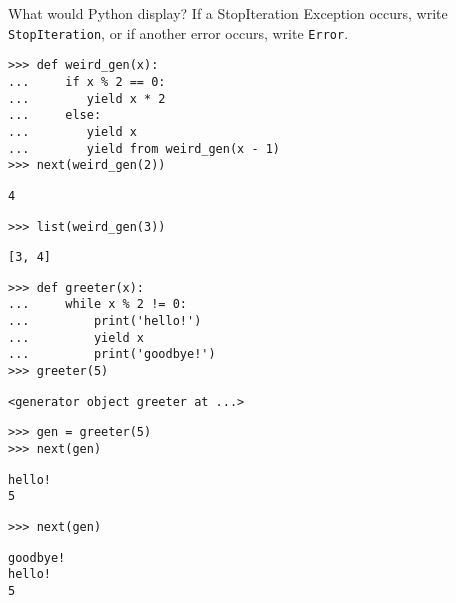 \question What would Python display? If a StopIteration Exception
occurs, write \texttt{StopIteration}, or if another error occurs,
write \texttt{Error}. 

\begin{lstlisting}
>>> def weird_gen(x):
... 	if x % 2 == 0:
... 	   yield x * 2
... 	else:
...        yield x
... 	   yield from weird_gen(x - 1)
>>> next(weird_gen(2))
\end{lstlisting}
\begin{solution}[.25in]
\begin{lstlisting}
4
\end{lstlisting}
\end{solution}

\begin{lstlisting}
>>> list(weird_gen(3))
\end{lstlisting}
\begin{solution}[.25in]
\begin{lstlisting}
[3, 4]
\end{lstlisting}
\end{solution}

\begin{lstlisting}
>>> def greeter(x):
...     while x % 2 != 0:
...         print('hello!')
...         yield x
...         print('goodbye!')
>>> greeter(5)
\end{lstlisting}
\begin{solution}[.25in]
\begin{lstlisting}
<generator object greeter at ...>
\end{lstlisting}
\end{solution}

\begin{lstlisting}
>>> gen = greeter(5)
>>> next(gen)
\end{lstlisting}
\begin{solution}[.5in]
\begin{lstlisting}
hello!
5
\end{lstlisting}
\end{solution}

\begin{lstlisting}
>>> next(gen)
\end{lstlisting}
\begin{solution}[.5in]
\begin{lstlisting}
goodbye!
hello!
5
\end{lstlisting}
\end{solution}

